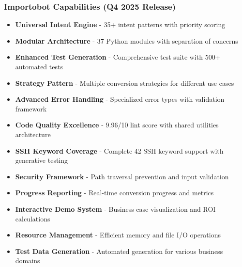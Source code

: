 \begin{frame}
\frametitle{Importobot Capabilities (Q4 2025 Release)}
\begin{itemize}
    \item \textbf{Universal Intent Engine} - 35+ intent patterns with priority scoring
    \item \textbf{Modular Architecture} - 37 Python modules with separation of concerns
    \item \textbf{Enhanced Test Generation} - Comprehensive test suite with 500+ automated tests
    \item \textbf{Strategy Pattern} - Multiple conversion strategies for different use cases
    \item \textbf{Advanced Error Handling} - Specialized error types with validation framework
    \item \textbf{Code Quality Excellence} - 9.96/10 lint score with shared utilities architecture
    \item \textbf{SSH Keyword Coverage} - Complete 42 SSH keyword support with generative testing
    \item \textbf{Security Framework} - Path traversal prevention and input validation
    \item \textbf{Progress Reporting} - Real-time conversion progress and metrics
    \item \textbf{Interactive Demo System} - Business case visualization and ROI calculations
    \item \textbf{Resource Management} - Efficient memory and file I/O operations
    \item \textbf{Test Data Generation} - Automated generation for various business domains
\end{itemize}
\end{frame}
